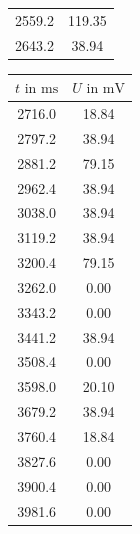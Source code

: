 \begin{table}
\begin{tabular}{|c c|}
  2559.2	&	119.35   \\
  2643.2	&	38.94   \\
  \bottomrule
\end{tabular}
\begin{tabular}{|c c}
  \toprule
  $t \text{ in } \si{\milli\second}$ & $U \text{ in } \si{\milli\volt}$\\
  \midrule
  2716.0	&	18.84   \\
  2797.2	&	38.94   \\
  2881.2	&	79.15   \\
  2962.4	&	38.94   \\
  3038.0	&	38.94   \\
  3119.2	&	38.94   \\
  3200.4	&	79.15   \\
  3262.0	&	0.00   \\
  3343.2	&	0.00   \\
  3441.2	&	38.94   \\
  3508.4	&	0.00   \\
  3598.0	&	20.10   \\
  3679.2	&	38.94   \\
  3760.4	&	18.84   \\
  3827.6	&	0.00   \\
  3900.4	&	0.00   \\
  3981.6	&	0.00   \\
  \bottomrule
  \end{tabular}
\end{table}


\FloatBarrier
